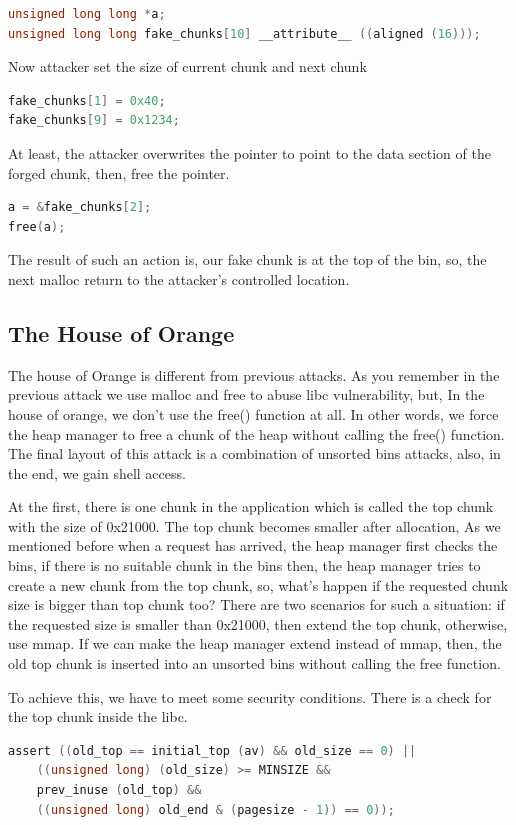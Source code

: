 \documentclass{masterthesis}
\newcommand*\ub{unsorted bins}
\begin{document}
\begin{lstlisting}[language=c,frame=tlrb]
unsigned long long *a;
unsigned long long fake_chunks[10] __attribute__ ((aligned (16)));
\end{lstlisting}

Now attacker set the size of current chunk and next chunk

\begin{lstlisting}[language=c,frame=tlrb]
fake_chunks[1] = 0x40;
fake_chunks[9] = 0x1234;
\end{lstlisting}

At least, the attacker overwrites the pointer to point to the data section of the forged chunk, then, free the pointer.

\begin{lstlisting}[language=c,frame=tlrb]
a = &fake_chunks[2];
free(a);
\end{lstlisting}

The result of such an action is, our fake chunk is at the top of the bin, so, the next malloc return to the attacker's controlled location.

\subsection{The House of Orange}
The house of Orange is different from previous attacks. As you remember in the previous attack we use malloc and free to abuse libc vulnerability, but, In the house of orange, we don’t use the free() function at all. In other words, we force the heap manager to free a chunk of the heap without calling the free() function. The final layout of this attack is a combination of \ub{} attacks, also, in the end, we gain shell access.

At the first, there is one chunk in the application which is called the top chunk with the size of 0x21000. The top chunk becomes smaller after allocation, As we mentioned before when a request has arrived, the heap manager first checks the bins, if there is no suitable chunk in the bins then, the heap manager tries to create a new chunk from the top chunk, so, what’s happen if the requested chunk size is bigger than top chunk too? There are two scenarios for such a situation: if the requested size is smaller than 0x21000, then extend the top chunk, otherwise, use mmap. If we can make the heap manager extend instead of mmap, then, the old top chunk is inserted into an \ub{} without calling the free function.

To achieve this, we have to meet some security conditions. There is a check for the top chunk inside the libc. 
\begin{lstlisting}[language=c,frame=tlrb]
 assert ((old_top == initial_top (av) && old_size == 0) ||
	((unsigned long) (old_size) >= MINSIZE &&
	prev_inuse (old_top) &&
	((unsigned long) old_end & (pagesize - 1)) == 0));
\end{lstlisting}
\end{document}
